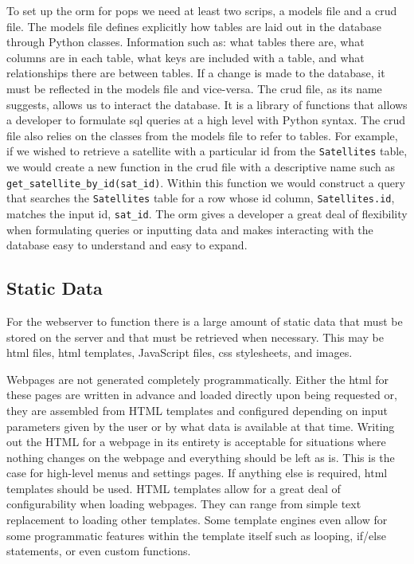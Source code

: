 To set up the \gls{orm} for \gls{pops} we need at least two scrips, a models
file and a \gls{crud} file. The models file defines explicitly how tables are
laid out in the database through Python classes. Information such as: what
tables there are, what columns are in each table, what keys are included with a
table, and what relationships there are between tables. If a change is made to
the database, it must be reflected in the models file and vice-versa.  The
\gls{crud} file, as its name suggests, allows us to interact the database.  It
is a library of functions that allows a developer to formulate \gls{sql}
queries at a high level with Python syntax. The \gls{crud} file also relies on
the classes from the models file to refer to tables. For example, if we wished
to retrieve a satellite with a particular id from the \texttt{Satellites}
table, we would create a new function in the crud file with a descriptive name
such as \texttt{get\_satellite\_by\_id(sat\_id)}. Within this function we would
construct a query that searches the \texttt{Satellites} table for a row whose
id column, \texttt{Satellites.id}, matches the input id, \texttt{sat\_id}. The
\gls{orm} gives a developer a great deal of flexibility when formulating
queries or inputting data and makes interacting with the database easy to
understand and easy to expand.


\subsection{Static Data}

For the webserver to function there is a large amount of static data that must
be stored on the server and that must be retrieved when necessary. This may be
\gls{html} files, \gls{html} templates, JavaScript files, \gls{css}
stylesheets, and images.

Webpages are not generated completely programmatically. Either the \gls{html}
for these pages are written in advance and loaded directly upon being requested
or, they are assembled from HTML templates and configured depending on input
parameters given by the user or by what data is available at that time. Writing
out the HTML for a webpage in its entirety is acceptable for situations where
nothing changes on the webpage and everything should be left as is. This is the
case for high-level menus and settings pages. If anything else is required,
\gls{html} templates should be used. HTML templates allow for a great deal of
configurability when loading webpages. They can range from simple text
replacement to loading other templates. Some template engines even allow for
some programmatic features within the template itself such as looping, if/else
statements, or even custom functions.

